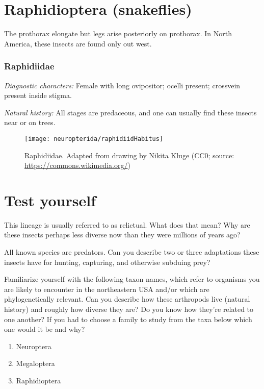 \section{Raphidioptera (snakeflies)}
The prothorax elongate but legs arise posteriorly on prothorax. In North America, these insects are found only out west.\vspace{3mm}

\subsubsection{Raphidiidae}
\noindent{}\textit{Diagnostic characters:} Female with long ovipositor; ocelli present; crossvein present inside stigma.\vspace{3mm}

\noindent{}\textit{Natural history:} All stages are predaceous, and one can usually find these insects near or on trees.\vspace{3mm}

\begin{figure}[ht!]
  \centering
    \texttt{[image: neuropterida/raphidiidHabitus]}
  \caption{Raphidiidae. Adapted from drawing by Nikita Kluge (CC0; source: \url{https://commons.wikimedia.org/})}
  \label{fig:raphid}
\end{figure}

\section*{Test yourself}
This lineage is usually referred to as relictual. What does that mean? Why are these insects perhaps less diverse now than they were millions of years ago?\vspace{3mm}

\noindent{}All known species are predators. Can you describe two or three adaptations these insects have for hunting, capturing, and otherwise subduing prey?\vspace{3mm}

\noindent{}Familiarize yourself with the following taxon names, which refer to organisms you are likely to encounter in the northeastern USA and/or which are phylogenetically relevant. Can you describe how these arthropods live (natural history) and roughly how diverse they are? Do you know how they're related to one another? If you had to choose a family to study from the taxa below which one would it be and why?
\begin{enumerate} 
\item Neuroptera  
\item Megaloptera
\item Raphidioptera
\end{enumerate}

\clearpage
\thispagestyle{empty}